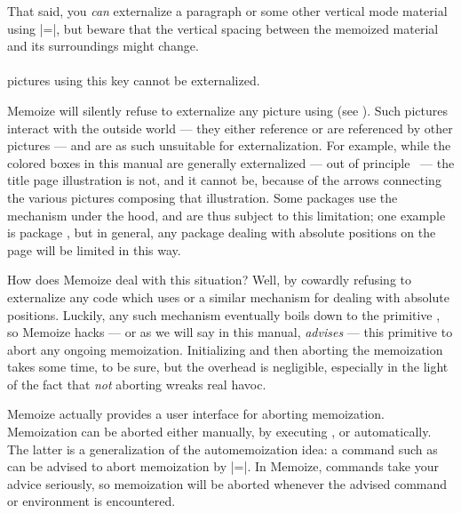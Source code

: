 \documentclass[a4paper,11pt]{article}
\begin{document}

That said, you \emph{can} externalize a paragraph or some other vertical mode
material using |=|, but beware that the
vertical spacing between the memoized material and its surroundings might
change.


\paragraph{}
\TikZ pictures using this key cannot be externalized.

Memoize will silently refuse to externalize any \TikZ picture using
 (see ).  Such pictures
interact with the outside world --- they either reference or are referenced by
other pictures --- and are as such unsuitable for externalization.  For
example, while the colored boxes in this manual are generally externalized ---
out of principle \Smiley\ --- the title page illustration is not, and it cannot
be, because of the arrows connecting the various \TikZ pictures composing that
illustration.  Some packages use the  mechanism
under the hood, and are thus subject to this limitation; one example is package
, but in general, any package dealing with absolute positions on the
page will be limited in this way.

How does Memoize deal with this situation?  Well, by cowardly refusing to
externalize any code which uses  or a similar
mechanism for dealing with absolute positions.  Luckily, any such mechanism
eventually boils down to the  primitive , so
Memoize hacks --- or as we will say in this manual, \emph{advises} --- this
primitive to abort any ongoing memoization.  Initializing and then aborting the
memoization takes some time, to be sure, but the overhead is negligible,
especially in the light of the fact that \emph{not} aborting wreaks real havoc.

Memoize actually provides a user interface for aborting memoization.
Memoization can be aborted either manually, by executing , or
automatically.  The latter is a generalization of the automemoization idea: a
command such as  can be advised to abort memoization by
|=|.  In Memoize,
commands take your advice seriously, so memoization will be aborted whenever
the advised command or environment is encountered.
\end{document}
